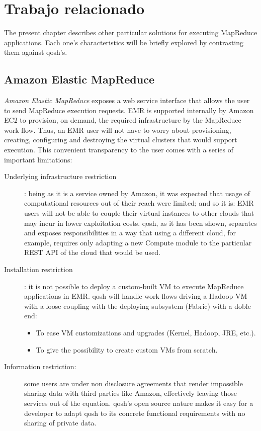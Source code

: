 \chapter{Trabajo relacionado}\label{cap:conclusiones}
\noindent The present chapter describes other particular solutions for executing MapReduce applications. Each one's characteristics will be briefly explored by contrasting them against qosh's.

\section{Amazon Elastic MapReduce}\label{sec:emc}
\noindent \emph{Amazon Elastic MapReduce} \cite{aws} exposes a web service interface that allows the user to send MapReduce execution requests. EMR is supported internally by Amazon EC2 to provision, on demand, the required infrastructure by the MapReduce work flow. Thus, an EMR user will not have to worry about provisioning, creating, configuring and destroying the virtual clusters that would support execution. This convenient transparency to the user comes with a series of important limitations:

\begin{description}
    \item[Underlying infrastructure restriction]: being as it is a service owned by Amazon, it was expected that usage of computational resources out of their reach were limited; and so it is: EMR users will not be able to couple their virtual instances to other clouds that may incur in lower exploitation costs.
    qosh, as it has been shown, separates and exposes responsibilities in a way that using a different cloud, for example, requires only adapting a new Compute module to the particular REST API of the cloud that would be used.
    \item[Installation restriction]: it is not possible to deploy a custom-built VM to execute MapReduce applications in EMR. qosh will handle work flows driving a Hadoop VM with a loose coupling with the deploying subsystem (Fabric) with a doble end:
    \begin{itemize}
        \item To ease VM customizations and upgrades (Kernel, Hadoop, JRE, etc.).
        \item To give the possibility to create custom VMs from scratch.
    \end{itemize}
    \item[Information restriction:] some users are under non disclosure agreements that render impossible sharing data with third parties like Amazon, effectively leaving those services out of the equation. qosh's open source nature makes it easy for a developer to adapt qosh to its concrete functional requirements with no sharing of private data.
\end{description}


